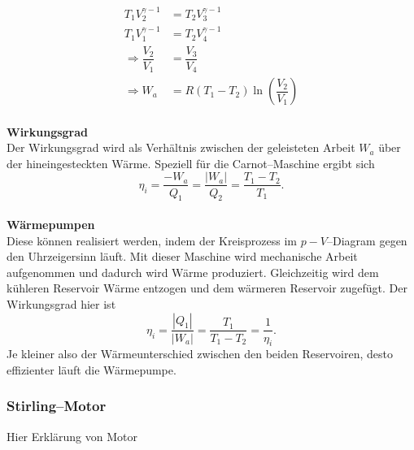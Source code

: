 \documentclass[a4paper,12pt]{article}
\begin{document}
\begin{align*}
        T_1V_2^{\gamma -1}&=T_2V_3^{\gamma -1}\\
        T_1V_1^{\gamma -1}&=T_2V_4^{\gamma -1}\\
        \Rightarrow \dfrac{V_2}{V_1}&=\dfrac{V_3}{V_4}\\
        \Rightarrow W_a&=R(T_1-T_2)\ln\left(\dfrac{V_2}{V_1}\right)
\end{align*}
\hfill\\\textbf{Wirkungsgrad}\\ 
Der Wirkungsgrad wird als Verhältnis zwischen der geleisteten Arbeit $W_a$ über der hineingesteckten Wärme. Speziell für die Carnot--Maschine ergibt sich
\[ 
        \eta _i=\dfrac{-W_a}{Q_1}=\dfrac{|W_a|}{Q_2}=\dfrac{T_1-T_2}{T_1}
.\] 
\hfill\\\textbf{Wärmepumpen}\\ 
Diese können realisiert werden, indem der Kreisprozess im $p-V$--Diagram gegen den Uhrzeigersinn läuft. Mit dieser Maschine wird mechanische Arbeit aufgenommen und dadurch wird Wärme produziert. Gleichzeitig wird dem kühleren Reservoir Wärme entzogen und dem wärmeren Reservoir zugefügt. Der Wirkungsgrad hier ist
\[ 
        \eta _i=\dfrac{|Q_1|}{|W_a|}=\dfrac{T_1}{T_1-T_2}=\dfrac{1}{\eta _i}
.\] 
Je kleiner also der Wärmeunterschied zwischen den beiden Reservoiren, desto effizienter läuft die Wärmepumpe.

\subsubsection{Stirling--Motor}
Hier Erklärung von Motor
\end{document}

